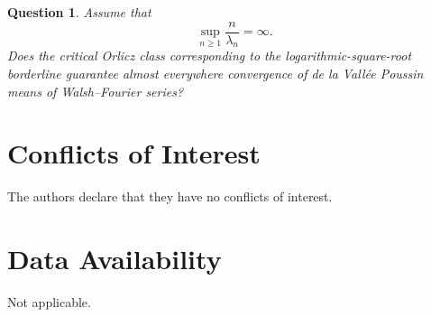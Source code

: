 \documentclass[11pt]{amsart}
\numberwithin{equation}{section}
\theoremstyle{plain}
\newtheorem{question}[theorem]{Question}
\begin{document}
\begin{question}
\label{prob:critical} Assume that 
\begin{equation*}
\sup_{n\ge1}\frac{n}{\lambda_n}=\infty.
\end{equation*}
Does the critical Orlicz class corresponding to the logarithmic-square-root
borderline guarantee almost everywhere convergence of de la Vall\'ee Poussin
means of Walsh--Fourier series?
\end{question}

\section*{Conflicts of Interest}

The authors declare that they have no conflicts of interest.

\section*{Data Availability}

Not applicable.
\end{document}
